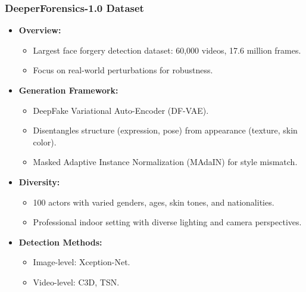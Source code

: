 \documentclass{beamer}
\begin{document}
\begin{frame}
    \frametitle{DeeperForensics-1.0 Dataset}
    \begin{itemize}
        \item \textbf{Overview:}
            \begin{itemize}
                \item Largest face forgery detection dataset: 60,000 videos, 17.6 million frames.
                \item Focus on real-world perturbations for robustness.
            \end{itemize}
        \item \textbf{Generation Framework:}
            \begin{itemize}
                \item DeepFake Variational Auto-Encoder (DF-VAE).
                \item Disentangles structure (expression, pose) from appearance (texture, skin color).
                \item Masked Adaptive Instance Normalization (MAdaIN) for style mismatch.
            \end{itemize}
        \item \textbf{Diversity:}
            \begin{itemize}
                \item 100 actors with varied genders, ages, skin tones, and nationalities.
                \item Professional indoor setting with diverse lighting and camera perspectives.
            \end{itemize}
        \item \textbf{Detection Methods:}
            \begin{itemize}
                \item Image-level: Xception-Net.
                \item Video-level: C3D, TSN.
            \end{itemize}
    \end{itemize}
\end{frame}
\end{document}
